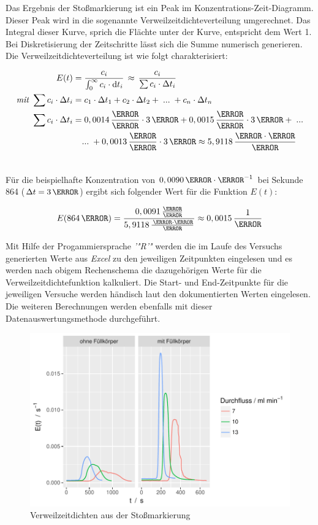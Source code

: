 \documentclass[12pt,liststotoc]{report}
\begin{document}
Das Ergebnis der Stoßmarkierung ist ein Peak im Konzentrations-Zeit-Diagramm. Dieser Peak wird in die sogenannte Verweilzeitdichteverteilung umgerechnet. Das Integral dieser Kurve, sprich die Flächte unter der Kurve, entspricht dem Wert 1. Bei Diskretisierung der Zeitschritte lässt sich die Summe numerisch generieren. Die Verweilzeitdichteverteilung ist wie folgt charakterisiert:


\begin{align}
E(t) =&\;\frac{c_{i}}{\int_{0}^{\infty} c_{i}\cdot \text{d}t_i}\,\approx\,\frac{c_i}{\sum c_i \cdot \Delta t_i}\\
\textit{mit }\sum c_i \cdot \Delta t_i =&\; c_1\cdot\Delta t_1 + c_2\cdot\Delta t_2 +\;...\;+c_n \cdot \Delta t_n \\
\sum c_i \cdot \Delta t_i =&\; 0,0014\,\frac{\mole}{\litre} \cdot 3\,\s + 0,0015\,\frac{\mole}{\litre}\cdot 3\,\s +\;...\notag\\
&...\;+0,0013\,\frac{\mole}{\litre} \cdot 3\,\s \approx 5,9118\,\frac{\mole\cdot\s}{\litre}\notag\\\notag
\end{align}

Für die beispielhafte Konzentration von $0,0090\,\mole\cdot\litre^{-1}$ bei Sekunde 864 ($\Delta t = 3\,\s$) ergibt sich folgender Wert für die Funktion $E(t)$:

\begin{equation*}
E(864\,\s) = \frac{0,0091\,\frac{\mole}{\litre}}{5,9118\,\frac{\,\mole\cdot\s}{\litre}} \approx0,0015\,\frac{1}{\s}
\end{equation*}

Mit Hilfe der Progammiersprache \textit{'"R'"} werden die im Laufe des Versuchs generierten Werte aus \textit{Excel} zu den jeweiligen Zeitpunkten eingelesen und es werden nach obigem Rechenschema die dazugehörigen Werte für die Verweilzeitdichtefunktion kalkuliert. Die Start- und End-Zeitpunkte für die jeweiligen Versuche werden händisch laut den dokumentierten Werten eingelesen. Die weiteren Berechnungen  werden ebenfalls mit dieser Datenauswertungsmethode durchgeführt.

\begin{figure}[H]
\centering
\includegraphics[width=1\textwidth]{Graphics/E_stoss.pdf}
\caption[Verweilzeitdichte Stoßmarkierungen]{Verweilzeitdichten aus der Stoßmarkierung}
\label{dichte_stoß}
\end{figure}
\noindent
\end{document}
